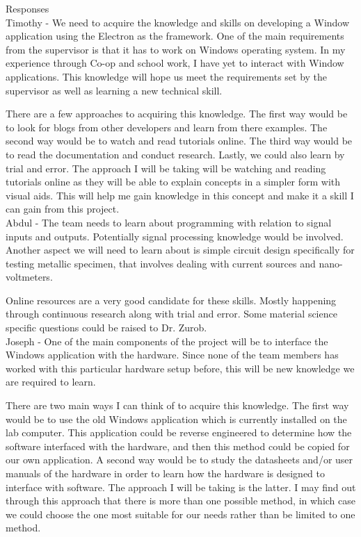 \documentclass[12pt, titlepage]{article}
\begin{document}
\noindent Responses\\


Timothy - We need to acquire the knowledge and skills on developing a Window application using the Electron as the framework. One of the main requirements
from the supervisor is that it has to work on Windows operating system. In my experience through Co-op and school work, I have 
yet to interact with Window applications. This knowledge will hope us meet the requirements set by the supervisor as well 
as learning a new technical skill. 

There are a few approaches to acquiring this knowledge. The first way would be to look for blogs from other developers and learn from there
examples. The second way would be to watch and read tutorials online. The third way would be to read the documentation and conduct research. Lastly, 
we could also learn by trial and error. The approach I will be taking will be watching and reading tutorials online as they will be able to explain 
concepts in a simpler form with visual aids. This will help me gain knowledge in this concept and 
make it a skill I can gain from this project.\\

Abdul - The team needs to learn about programming with relation to signal inputs and outputs. Potentially signal processing knowledge would be involved. Another aspect we will need to learn about is simple circuit design specifically for testing metallic specimen, that involves dealing with current sources and nano-voltmeters.

Online resources are a very good candidate for these skills. Mostly happening through continuous research along with trial and error. Some material science specific questions could be raised to Dr. Zurob.\\

Joseph - One of the main components of the project will be to interface the Windows application with the hardware. Since none of the team members has worked with this particular hardware setup before, this will be new knowledge we are required to learn.  

There are two main ways I can think of to acquire this knowledge. The first way would be to use the old Windows application which is currently installed on the lab computer. This application could be reverse engineered to determine how the software interfaced with the hardware, and then this method could be copied for our own application. A second way would be to study the datasheets and/or user manuals of the hardware in order to learn how the hardware is designed to interface with software. The approach I will be taking is the latter. I may find out through this approach that there is more than one possible method, in which case we could choose the one most suitable for our needs rather than be limited to one method.\\ 
\end{document}
